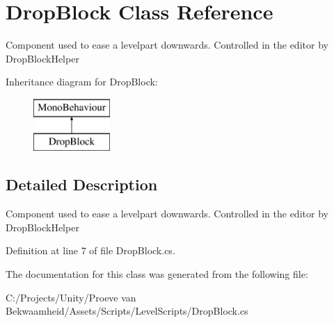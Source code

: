 \hypertarget{class_drop_block}{\section{Drop\+Block Class Reference}
\label{class_drop_block}
}


Component used to ease a levelpart downwards. Controlled in the editor by Drop\+Block\+Helper  


Inheritance diagram for Drop\+Block\+:\begin{figure}[H]
\begin{center}
\leavevmode
\includegraphics[height=2.000000cm]{class_drop_block}
\end{center}
\end{figure}


\subsection{Detailed Description}
Component used to ease a levelpart downwards. Controlled in the editor by Drop\+Block\+Helper 



Definition at line 7 of file Drop\+Block.\+cs.



The documentation for this class was generated from the following file\+:\begin{DoxyCompactItemize}
\item 
C\+:/\+Projects/\+Unity/\+Proeve van Bekwaamheid/\+Assets/\+Scripts/\+Level\+Scripts/Drop\+Block.\+cs\end{DoxyCompactItemize}
